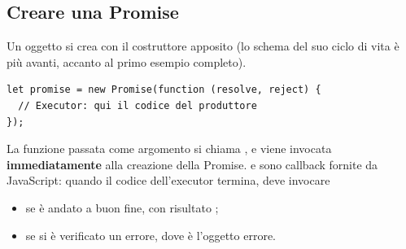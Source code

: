 \subsection{Creare una Promise}

Un oggetto  si crea con il costruttore apposito (lo schema del
suo ciclo di vita è più avanti, accanto al primo esempio completo).

\begin{lstlisting}[style=js]
let promise = new Promise(function (resolve, reject) {
  // Executor: qui il codice del produttore
});
\end{lstlisting}

La funzione passata come argomento si chiama , e viene invocata
\textbf{immediatamente} alla creazione della Promise.  e
 sono callback fornite da JavaScript: quando il codice
dell'executor termina, deve invocare

\begin{itemize}
  \item {} se è andato a buon fine, con risultato
        ;
  \item {} se si è verificato un errore, dove  è
        l'oggetto errore.
\end{itemize}


